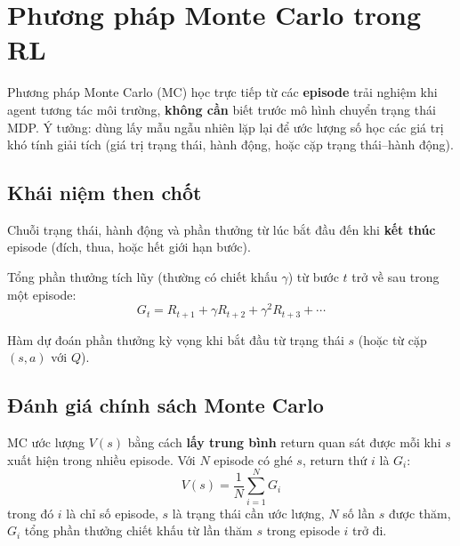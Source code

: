\section{Phương pháp Monte Carlo trong RL}
\label{sec:monte-carlo}

\begin{dinhnghia}[title={Monte Carlo trong học tăng cường}]
Phương pháp Monte Carlo (MC) học trực tiếp từ các \textbf{episode} trải nghiệm khi agent tương tác môi trường, \textbf{không cần} biết trước mô hình chuyển trạng thái MDP. Ý tưởng: dùng lấy mẫu ngẫu nhiên lặp lại để ước lượng số học các giá trị khó tính giải tích (giá trị trạng thái, hành động, hoặc cặp trạng thái--hành động).
\end{dinhnghia}

\subsection{Khái niệm then chốt}

\begin{dinhnghia}[title={Episode}]
Chuỗi trạng thái, hành động và phần thưởng từ lúc bắt đầu đến khi \textbf{kết thúc} episode (đích, thua, hoặc hết giới hạn bước).
\end{dinhnghia}

\begin{dinhnghia}[title={Return $G_t$}]
Tổng phần thưởng tích lũy (thường có chiết khấu $\gamma$) từ bước $t$ trở về sau trong một episode:
\[
G_t = R_{t+1} + \gamma R_{t+2} + \gamma^2 R_{t+3} + \cdots
\]
\end{dinhnghia}

\begin{dinhnghia}[title={Hàm giá trị $V$}]
Hàm dự đoán phần thưởng kỳ vọng khi bắt đầu từ trạng thái $s$ (hoặc từ cặp $(s,a)$ với $Q$).
\end{dinhnghia}

\subsection{Đánh giá chính sách Monte Carlo}

\begin{ynghia}[title={Ước lượng trung bình return}]
MC ước lượng $V(s)$ bằng cách \textbf{lấy trung bình} return quan sát được mỗi khi $s$ xuất hiện trong nhiều episode. Với $N$ episode có ghé $s$, return thứ $i$ là $G_i$:
\[
V(s) = \frac{1}{N} \sum_{i=1}^{N} G_i
\]
trong đó $i$ là chỉ số episode, $s$ là trạng thái cần ước lượng, $N$ số lần $s$ được thăm, $G_i$ tổng phần thưởng chiết khấu từ lần thăm $s$ trong episode $i$ trở đi.
\end{ynghia}

